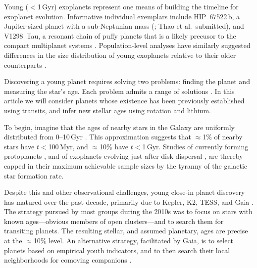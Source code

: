 \documentclass[11pt,twocolumn,tighten]{aastex63}
\begin{document}
Young ($<$1\,Gyr) exoplanets represent one means of building the
timeline for exoplanet evolution.  Informative individual exemplars
include HIP~67522\,b, a Jupiter-sized planet with a sub-Neptunian mass
(\citealt{Rizzuto_2020}; Thao et al.~submitted), and V1298~Tau, a
resonant chain of puffy planets that is a likely precusor to the
compact multiplanet systems \citep{David_2019}.  Population-level
analyses have similarly suggested differences in the size distribution
of young exoplanets relative to their older counterparts
\citep{Berger_2020b_rpage,David_2021,Sandoval_2021,2023AJ....166..248C,Vach2024}.

Discovering a young planet requires solving two problems: finding the
planet and measuring the star's age.  Each problem admits a range of
solutions
\citep[e.g.][]{2008Sci...322.1348M,2012ApJ...756L..33Q,2024AJ....167..193T}.
In this article we will consider planets whose existence has been
previously established using transits, and infer new stellar ages
using rotation and lithium.

To begin, imagine that the ages of nearby stars in the Galaxy are
uniformly distributed from 0--10\,Gyr
\citep[][]{2000MNRAS.318..658B,Nordstrom_2004}.  This approximation
suggests that $\approx$1\% of nearby stars have $t$$<$100\,Myr, and
$\approx$10\% have $t$$<$1\,Gyr.  Studies of currently forming
protoplanets \citep{2018A&A...617A..44K}, and of exoplanets evolving
just after disk dispersal \citep[e.g.][]{2022MNRAS.512.5067K}, are
thereby capped in their maximum achievable sample sizes by the tyranny
of the galactic star formation rate.

Despite this and other observational challenges, young close-in planet
discovery has matured over the past decade, primarily due to Kepler,
K2, TESS, and Gaia
\citep[e.g.][]{Meibom_2013,Mann_K2_25_2016,Curtis_2018,Livingston_2018,Bouma_2020_toi837,Plavchan_2020,Newton_2021,Nardiello_2022,Barber_2022,Zhou_2022,Zakhozhay_2022,Wood_2023}.
The strategy pursued by most groups during the 2010s was to focus on
stars with known ages---obvious members of open clusters---and to
search them for transiting planets.  The resulting stellar, and
assumed planetary, ages are precise at the $\approx$10\% level.  
An alternative strategy, facilitated by Gaia, is to select 
planets based on empirical youth indicators, and to then search their local
neighborhoods for comoving companions \citep[e.g.][]{Tofflemire_2021}.
\end{document}
